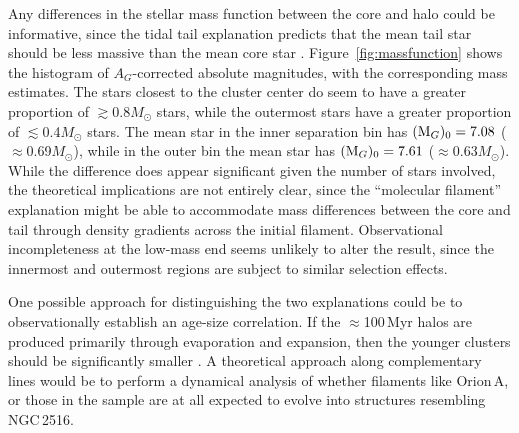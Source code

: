 \documentclass[12pt,twocolumn,tighten]{aastex63}
\newcommand{\cn}{NGC\,2516} %
\begin{document}
Any differences in the stellar mass function between the core and halo
could be informative, since the tidal tail explanation predicts that
the mean tail star should be less massive than the mean core
star \citep[{\it e.g.},][]{chumak_tails_2006}.
Figure~\ref{fig:massfunction} shows the histogram of $A_G$-corrected
absolute magnitudes, with the corresponding
\citet{pecaut_mamajek_2013} mass estimates.  The stars closest to the
cluster center do seem to have a greater proportion of $\gtrsim$0.8$M_\odot$
stars, while the outermost stars have a greater proportion of
$\lesssim$0.4$M_\odot$ stars.  The mean star in the inner separation
bin has $({\rm M}_G)_0=7.08$ ($\approx$0.69$M_\odot$), while in the
outer bin the mean star has $({\rm M}_G)_0=7.61$
($\approx$0.63$M_\odot$).  While the difference does appear
significant given the number of stars involved, the theoretical
implications are not entirely clear, since the ``molecular filament''
explanation might be able to accommodate mass differences between the
core and tail through density gradients across the initial filament.
Observational incompleteness at the low-mass end seems unlikely to
alter the result, since the innermost and outermost regions are 
subject to similar selection effects.

One possible approach for distinguishing the two explanations could be
to observationally establish an age-size correlation.  If the
$\approx$100\,Myr halos are produced primarily through evaporation and
expansion, then the younger clusters should be significantly smaller
\citep{chumak_tails_2006,chumak_realOCs_2006}.  A theoretical approach
along complementary lines would be to perform a dynamical analysis of
whether filaments like Orion\,A, or those in the
\citet{zucker_physical_2018} sample are at all expected to evolve into
structures resembling \cn.
\end{document}
